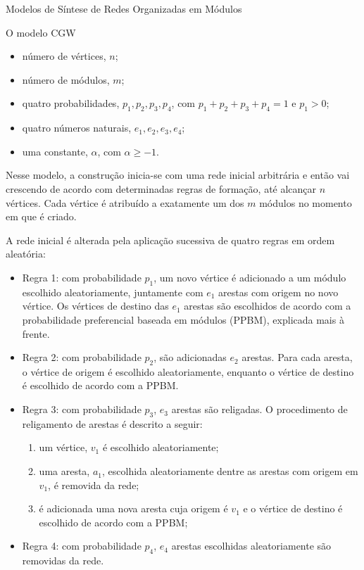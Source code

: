 \begin{section}{Modelos de Síntese de Redes Organizadas em Módulos}
\begin{subsection}{O modelo CGW}
\begin{itemize}
\item número de vértices, $n$;
\item número de módulos, $m$;
\item quatro probabilidades, $p_1, p_2, p_3, p_4$, com $p_1 + p_2 + p_3 + p_4 = 1$ e $p_1 > 0$;
\item quatro números naturais, $e_1, e_2, e_3, e_4$;
\item uma constante, $\alpha$, com $\alpha \ge -1$.
\end{itemize}

Nesse modelo, a construção inicia-se com uma rede inicial arbitrária e então vai crescendo de acordo com determinadas regras de formação, até alcançar $n$ vértices. Cada vértice é atribuído a exatamente um dos $m$ módulos no momento em que é criado.

A rede inicial é alterada pela aplicação sucessiva de quatro regras em ordem aleatória:

\begin{itemize}
	
	\item Regra 1: com probabilidade $p_1$, um novo vértice é adicionado a um módulo escolhido aleatoriamente, juntamente com $e_1$ arestas com origem no novo vértice. Os vértices de destino das $e_1$ arestas são escolhidos de acordo com a probabilidade preferencial baseada em módulos (PPBM), explicada mais à frente.
	
	\item Regra 2: com probabilidade $p_2$, são adicionadas $e_2$ arestas. Para cada aresta, o vértice de origem é escolhido aleatoriamente, enquanto o vértice de destino é escolhido de acordo com a PPBM.
	
	\item Regra 3: com probabilidade $p_3$, $e_3$ arestas são religadas. O procedimento de religamento de arestas é descrito a seguir:
	
	\begin{enumerate}
		\item um vértice, $v_1$ é escolhido aleatoriamente;
		\item uma aresta, $a_1$, escolhida aleatoriamente dentre as arestas com origem em $v_1$, é removida da rede;
		\item é adicionada uma nova aresta cuja origem é $v_1$ e o vértice de destino é escolhido de acordo com a PPBM;
	\end{enumerate}
	
	\item Regra 4: com probabilidade $p_4$, $e_4$ arestas escolhidas aleatoriamente são removidas da rede.
	

\end{itemize}
\end{subsection}
\end{section}
